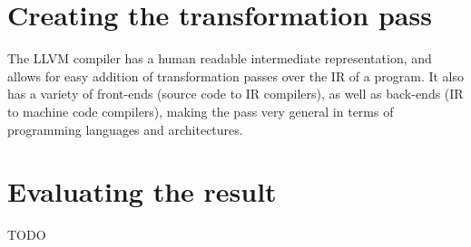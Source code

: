 \documentclass{article}
\begin{document}
\section*{Creating the transformation pass}
The LLVM compiler has a human readable intermediate representation, and allows for easy addition of transformation passes over the IR of a program.
It also has a variety of front-ends (source code to IR compilers), as well as back-ends (IR to machine code compilers), making the pass very general in terms of programming languages and architectures.

\section*{Evaluating the result}
TODO
\end{document}
